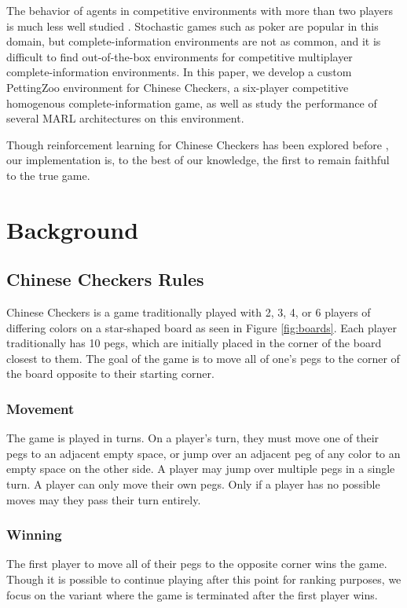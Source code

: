 \documentclass[12pt, a4paper, twocolumn]{article}
\begin{document}
The behavior of agents in competitive environments with more than two players is much less well studied \cite{GrowingMARLInterest}. Stochastic games such as poker are popular in this domain, but complete-information environments are not as common, and it is difficult to find out-of-the-box environments for competitive multiplayer complete-information environments. In this paper, we develop a custom PettingZoo environment for Chinese Checkers, a six-player competitive homogenous complete-information game, as well as study the performance of several MARL architectures on this environment.

Though reinforcement learning for Chinese Checkers has been explored before \cite{ChineseCheckersRL1} \cite{ChineseCheckersRL2}, our implementation is, to the best of our knowledge, the first to remain faithful to the true game.

\section{Background}

\subsection{Chinese Checkers Rules \cite{ChineseCheckersRules}}

Chinese Checkers is a game traditionally played with 2, 3, 4, or 6 players of differing colors on a star-shaped board as seen in Figure \ref{fig:boards}. Each player traditionally has 10 pegs, which are initially placed in the corner of the board closest to them. The goal of the game is to move all of one's pegs to the corner of the board opposite to their starting corner.

\subsubsection{Movement}
The game is played in turns. On a player's turn, they must move one of their pegs to an adjacent empty space, or jump over an adjacent peg of any color to an empty space on the other side. A player may jump over multiple pegs in a single turn. A player can only move their own pegs. Only if a player has no possible moves may they pass their turn entirely.

\subsubsection{Winning}
The first player to move all of their pegs to the opposite corner wins the game. Though it is possible to continue playing after this point for ranking purposes, we focus on the variant where the game is terminated after the first player wins.
\end{document}
